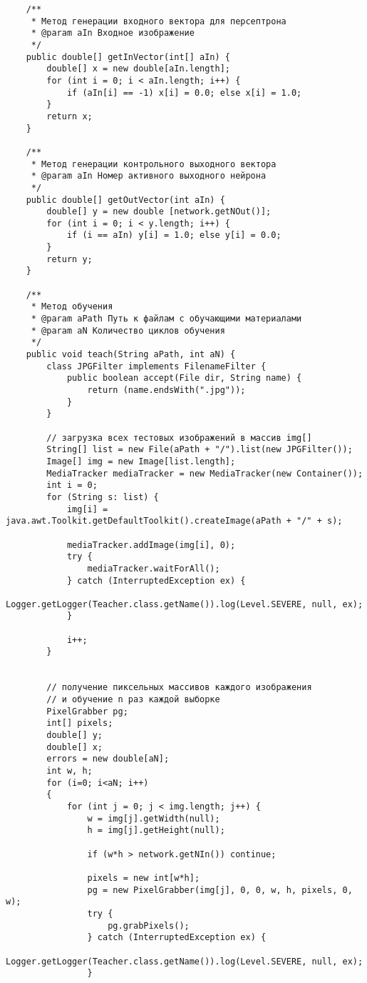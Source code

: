\begin{verbatim}
	/**
	 * Метод генерации входного вектора для персептрона
	 * @param aIn Входное изображение
	 */
	public double[] getInVector(int[] aIn) {
		double[] x = new double[aIn.length];
        for (int i = 0; i < aIn.length; i++) {
            if (aIn[i] == -1) x[i] = 0.0; else x[i] = 1.0;
        }
        return x;
	}

	/**
	 * Метод генерации контрольного выходного вектора
	 * @param aIn Номер активного выходного нейрона
	 */
	public double[] getOutVector(int aIn) {
		double[] y = new double [network.getNOut()];
        for (int i = 0; i < y.length; i++) {
            if (i == aIn) y[i] = 1.0; else y[i] = 0.0;
        }
        return y;
	}

	/**
	 * Метод обучения
	 * @param aPath Путь к файлам с обучающими материалами
	 * @param aN Количество циклов обучения
	 */
	public void teach(String aPath, int aN) {
		class JPGFilter implements FilenameFilter {
            public boolean accept(File dir, String name) {
                return (name.endsWith(".jpg"));
            }
        }     
 
        // загрузка всех тестовых изображений в массив img[]
        String[] list = new File(aPath + "/").list(new JPGFilter());
        Image[] img = new Image[list.length];        
        MediaTracker mediaTracker = new MediaTracker(new Container());        
        int i = 0;
        for (String s: list) {
            img[i] = java.awt.Toolkit.getDefaultToolkit().createImage(aPath + "/" + s);
 
            mediaTracker.addImage(img[i], 0);
            try {
                mediaTracker.waitForAll();
            } catch (InterruptedException ex) {
                Logger.getLogger(Teacher.class.getName()).log(Level.SEVERE, null, ex);
            }
 
            i++;
        }
 
 
        // получение пиксельных массивов каждого изображения
        // и обучение n раз каждой выборке
        PixelGrabber pg;
        int[] pixels;
		double[] y;
		double[] x;
		errors = new double[aN];
        int w, h;
        for (i=0; i<aN; i++)
        {
            for (int j = 0; j < img.length; j++) {
                w = img[j].getWidth(null);
                h = img[j].getHeight(null);
 
                if (w*h > network.getNIn()) continue;
 
                pixels = new int[w*h];
                pg = new PixelGrabber(img[j], 0, 0, w, h, pixels, 0, w);
                try {
                    pg.grabPixels();
                } catch (InterruptedException ex) {
                    Logger.getLogger(Teacher.class.getName()).log(Level.SEVERE, null, ex);
                }
 

\end{verbatim}
